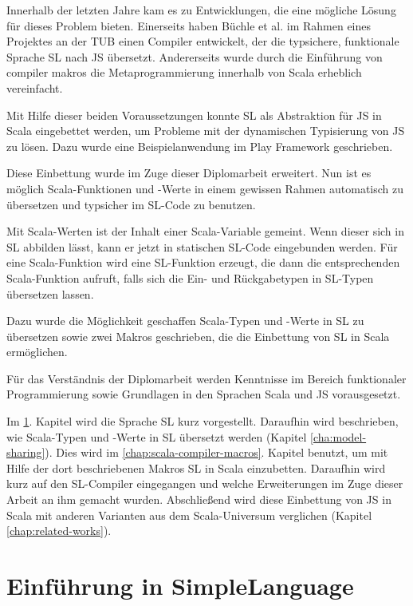 \documentclass[12pt,bibtotoc]{scrreprt}
\begin{document}
Innerhalb der letzten Jahre kam es zu Entwicklungen, die eine mögliche Lösung für dieses Problem bieten. Einerseits haben Büchle et al. im Rahmen eines Projektes an der \ac{TUB} einen Compiler entwickelt, der die typsichere, funktionale Sprache \ac{SL} nach JS übersetzt\cite{Buchle2013}. Andererseits wurde durch die Einführung von compiler makros \cite{Burmako2013} die Metaprogrammierung innerhalb von Scala erheblich vereinfacht.

Mit Hilfe dieser beiden Voraussetzungen konnte SL als Abstraktion für JS in Scala eingebettet werden\cite{Hoger2013}, um Probleme mit der dynamischen Typisierung von JS zu lösen. Dazu wurde eine Beispielanwendung im Play Framework geschrieben\cite{Play1}. 

Diese Einbettung wurde im Zuge dieser Diplomarbeit erweitert. Nun ist es  möglich Scala-Funktionen und -Werte in einem gewissen Rahmen automatisch zu übersetzen und typsicher im SL-Code zu benutzen. 

Mit Scala-Werten ist der Inhalt einer Scala-Variable gemeint. Wenn dieser sich in SL abbilden lässt, kann er jetzt in statischen SL-Code eingebunden werden. Für eine Scala-Funktion wird eine SL-Funktion erzeugt, die dann die entsprechenden Scala-Funktion aufruft, falls sich die Ein- und Rückgabetypen in SL-Typen übersetzen lassen.

Dazu wurde die Möglichkeit geschaffen Scala-Typen und -Werte in SL zu übersetzen sowie zwei Makros geschrieben, die die Einbettung von SL in Scala ermöglichen. 

Für das Verständnis der Diplomarbeit werden Kenntnisse im Bereich funktionaler Programmierung sowie Grundlagen in den Sprachen Scala und JS vorausgesetzt.

Im \ref{cha:sl-introduction}. Kapitel wird die Sprache SL kurz vorgestellt. Daraufhin wird beschrieben, wie Scala-Typen und -Werte in SL übersetzt werden (Kapitel \ref{cha:model-sharing}). Dies wird im \ref{chap:scala-compiler-macros}. Kapitel benutzt, um mit Hilfe der dort beschriebenen Makros SL in Scala einzubetten. Daraufhin wird kurz auf den SL-Compiler eingegangen und welche Erweiterungen im Zuge dieser Arbeit an ihm gemacht wurden. Abschließend wird diese Einbettung von JS in Scala mit anderen Varianten aus dem Scala-Universum verglichen (Kapitel \ref{chap:related-works}). 

\chapter{Einführung in SimpleLanguage}
\label{cha:sl-introduction}
\end{document}
